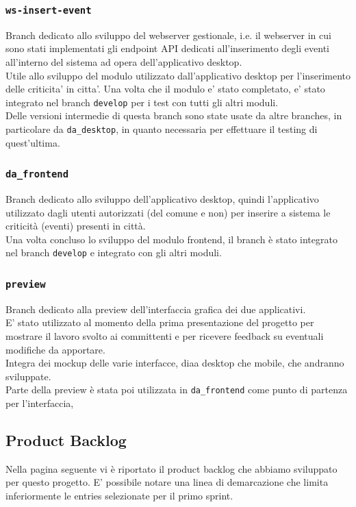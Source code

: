 \documentclass{article}
\begin{document}
\subsubsection{\texttt{ws-insert-event}}
Branch dedicato allo sviluppo del webserver gestionale, i.e. il webserver in cui sono stati implementati gli endpoint API dedicati all'inserimento degli eventi all'interno del sistema ad opera dell'applicativo desktop. \\
Utile allo sviluppo del modulo utilizzato dall'applicativo desktop per l'inserimento delle criticita' in citta'.
Una volta che il modulo e' stato completato, e' stato integrato nel branch \texttt{develop} per i test con tutti gli altri moduli.\\
Delle versioni intermedie di questa branch sono state usate da altre branches, in particolare da \texttt{da\_desktop}, in quanto necessaria per effettuare il testing di quest'ultima.


\subsubsection{\texttt{da\_frontend}}
Branch dedicato allo sviluppo dell'applicativo desktop, quindi l'applicativo utilizzato dagli utenti autorizzati (del comune e non) per inserire a sistema le criticità (eventi) presenti in città.\\
Una volta concluso lo sviluppo del modulo frontend, il branch è stato integrato nel branch \texttt{develop} e integrato con gli altri moduli.

\subsubsection{\texttt{preview}}
Branch dedicato alla preview dell'interfaccia grafica dei due applicativi.\\
E' stato utilizzato al momento della prima presentazione del progetto per mostrare il lavoro svolto ai committenti e per ricevere feedback su eventuali modifiche da apportare.\\
Integra dei mockup delle varie interfacce, diaa desktop che mobile, che andranno sviluppate.\\
Parte della preview è stata poi utilizzata in \texttt{da\_frontend} come punto di partenza per l'interfaccia,

\clearpage

\subsection{Product Backlog}
Nella pagina seguente vi è riportato il product backlog che abbiamo sviluppato per questo progetto. E' possibile notare una linea di demarcazione che limita inferiormente le entries selezionate per il primo sprint.
\end{document}

